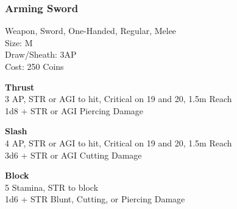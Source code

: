 \subsubsection{Arming Sword}\label{weapon:armingSword}
Weapon, Sword, One-Handed, Regular, Melee\\
Size: M\\
Draw/Sheath: 3AP\\
Cost: 250 Coins

\textbf{Thrust}\\
3 AP, STR or AGI to hit, Critical on 19 and 20, 1.5m Reach\\
1d8 + \texttimes STR or AGI Piercing Damage

\textbf{Slash}\\
4 AP, STR or AGI to hit, Critical on 19 and 20, 1.5m Reach\\
3d6 + \texttimes STR or AGI Cutting Damage

\textbf{Block}\\
5 Stamina, STR to block\\
1d6 + \texttimes STR Blunt, Cutting, or Piercing Damage